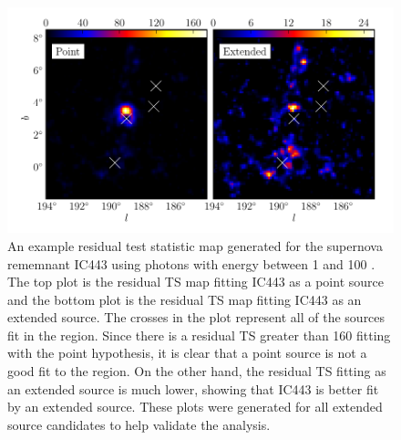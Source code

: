 \documentclass[12pt,preprint]{aastex}
\newcommand{\gev}{\text{GeV}\xspace}
\begin{document}
\begin{figure}
  \begin{center}
  \includegraphics{ic443_plots/res_tsmap_ic443.pdf}

  \caption{An example residual test statistic map generated for the
  supernova rememnant IC443 using photons with energy between 1 \gev and
  100 \gev.  The top plot is the residual TS map fitting IC443
  as a point source and the bottom plot is the residual TS map fitting
  IC443 as an extended source. The crosses in the plot represent all of
  the sources fit in the region. Since there is a residual TS greater
  than 160 fitting with the point hypothesis, it is clear that a point
  source is not a good fit to the region. On the other hand,
  the residual TS fitting as an extended source is much lower, showing
  that IC443 is better fit by an extended source. These plots were generated
  for all extended source candidates to help validate the analysis.}
  \label{res_tsmaps}
  \end{center}
\end{figure}
\end{document}
